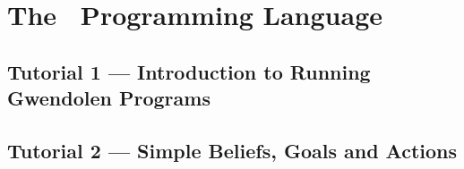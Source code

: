 %
\chapter{The \gwendolen\ Programming Language}

\section{Tutorial 1 --- Introduction to Running Gwendolen Programs}

{
  \let\section\subsection
  \let\subsection\subsubsection
  \let\subsubsection\paragraph
  
  
  }

\section{Tutorial 2 --- Simple Beliefs, Goals and Actions}

{
  \let\section\subsection
  \let\subsection\subsubsection
  \let\subsubsection\paragraph
  
  
  }

